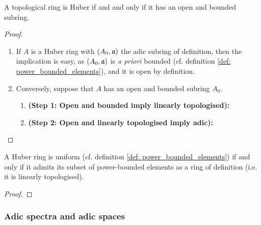                 \begin{proposition} \label{prop: huber_criteria}
                    A topological ring is Huber if and and only if it has an open and bounded subring. 
                \end{proposition}
                    \begin{proof}
                        \noindent
                        \begin{enumerate}
                            \item If $A$ is a Huber ring with $(A_0, \mathfrak{a})$ the adic subring of definition, then the implication is easy, as $(A_0, \mathfrak{a})$ is \textit{a priori} bounded (cf. definition \ref{def: power_bounded_elements}), and it is open by definition. 
                            \item Conversely, suppose that $A$ has an open and bounded subring $A_0$. 
                                \begin{enumerate}
                                    \item \textbf{(Step 1: Open and bounded imply linearly topologised):}
                                    \item \textbf{(Step 2: Open and linearly topologised imply adic):}
                                \end{enumerate}
                        \end{enumerate}
                    \end{proof}
                \begin{corollary} \label{coro: uniformity_criterion}
                    A Huber ring is uniform (cf. definition \ref{def: power_bounded_elements}) if and only if it admits its subset of power-bounded elements as a ring of definition (i.e. it is linearly topologised). 
                \end{corollary}
                    \begin{proof}
                        
                    \end{proof}
                    
            \subsubsection{Adic spectra and adic spaces}
